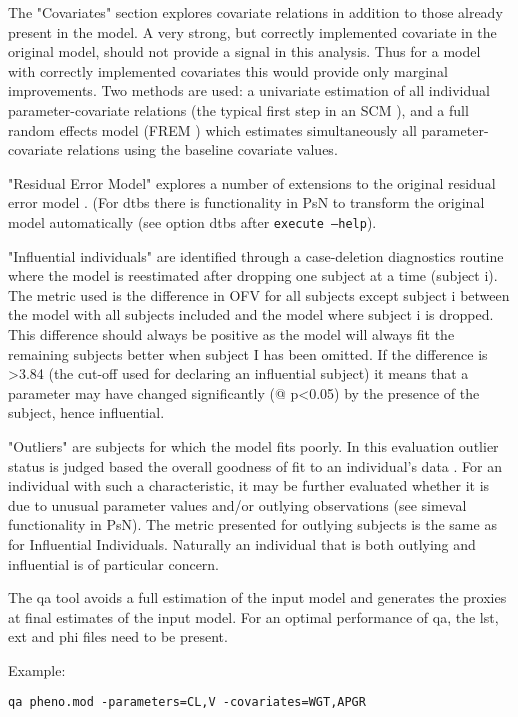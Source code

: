 The "Covariates" section explores covariate relations in addition to those already present in the model. A very strong, but correctly implemented covariate in the original model, should not provide a signal in this analysis. Thus for a model with correctly implemented covariates this would provide only marginal improvements. Two methods are used: a univariate estimation of all individual parameter-covariate relations (the typical first step in an SCM \cite{Jonsson2}), and a full random effects model (FREM \cite{Karlsson, Yun, Yngman}) which estimates simultaneously all parameter-covariate relations using the baseline covariate values.

"Residual Error Model" explores a number of extensions to the original residual error model \cite{Ibrahim, Karlsson2, Karlsson3, Dosne2012}. (For dtbs there is functionality in PsN to transform the original model automatically (see option dtbs after \verb|execute –help|). 

"Influential individuals" are identified through a case-deletion diagnostics routine where the model is reestimated after dropping one subject at a time (subject i). The metric used is the difference in OFV for all subjects except subject i between the model with all subjects included and the model where subject i is dropped. This difference should always be positive as the model will always fit the remaining subjects better when subject I has been omitted. If the difference is >3.84 (the cut-off used for declaring an influential subject) it means that a parameter may have changed significantly (@ p<0.05) by the presence of the subject, hence influential.

"Outliers" are subjects for which the model fits poorly. In this evaluation outlier status is judged based the overall goodness of fit to an individual's data \cite{Largajolli}. For an individual with such a characteristic, it may be further evaluated whether it is due to unusual parameter values and/or outlying observations (see simeval functionality in PsN). The metric presented for outlying subjects is the same as for Influential Individuals. Naturally an individual that is both outlying and influential is of particular concern.

The qa tool avoids a full estimation of the input model and generates the proxies at final estimates of the input model. For an optimal performance of qa, the lst, ext and phi files need to be present.
\newpage

Example:
\begin{verbatim}
qa pheno.mod -parameters=CL,V -covariates=WGT,APGR
\end{verbatim}

